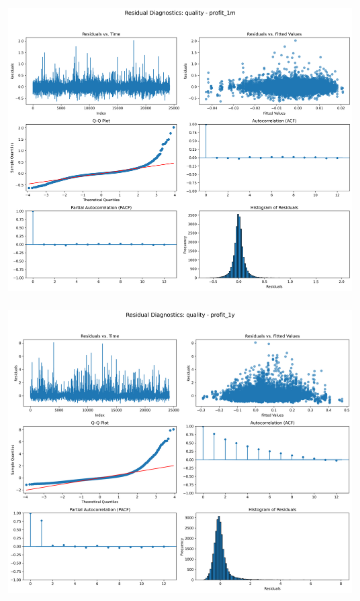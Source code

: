 \documentclass[11pt,english,a4paper,hidelinks]{book}
\begin{document}
\begin{figure}[H]
    \centering
    \begin{subfigure}[b]{0.32\textwidth}
        \centering
        \includegraphics[width=\textwidth]{images/code/models/linear_regression/first_model/EU/quality_profit_1m_residuals.png}
    \end{subfigure}
    \hfill
    \begin{subfigure}[b]{0.32\textwidth}
        \centering
        \includegraphics[width=\textwidth]{images/code/models/linear_regression/first_model/EU/quality_profit_1y_residuals.png}

\end{subfigure}
\end{figure}
\end{document}
